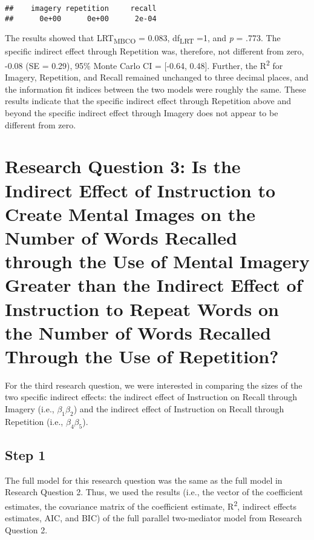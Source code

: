 \documentclass[11pt,]{article}
\begin{document}
\begin{verbatim}
##    imagery repetition     recall 
##      0e+00      0e+00      2e-04
\end{verbatim}

The results showed that LRT\textsubscript{MBCO} = 0.083,
df\textsubscript{LRT} =1, and \emph{p} = .773. The specific indirect
effect through Repetition was, therefore, not different from zero, -0.08
(SE = 0.29), 95\% Monte Carlo CI = {[}-0.64, 0.48{]}. Further, the
R\textsuperscript{2} for Imagery, Repetition, and Recall remained
unchanged to three decimal places, and the information fit indices
between the two models were roughly the same. These results indicate
that the specific indirect effect through Repetition above and beyond
the specific indirect effect through Imagery does not appear to be
different from zero.

\hypertarget{research-question-3-is-the-indirect-effect-of-instruction-to-create-mental-images-on-the-number-of-words-recalled-through-the-use-of-mental-imagery-greater-than-the-indirect-effect-of-instruction-to-repeat-words-on-the-number-of-words-recalled-through-the-use-of-repetition}{%
\section{Research Question 3: Is the Indirect Effect of Instruction to
Create Mental Images on the Number of Words Recalled through the Use of
Mental Imagery Greater than the Indirect Effect of Instruction to Repeat
Words on the Number of Words Recalled Through the Use of
Repetition?}\label{research-question-3-is-the-indirect-effect-of-instruction-to-create-mental-images-on-the-number-of-words-recalled-through-the-use-of-mental-imagery-greater-than-the-indirect-effect-of-instruction-to-repeat-words-on-the-number-of-words-recalled-through-the-use-of-repetition}}

For the third research question, we were interested in comparing the
sizes of the two specific indirect effects: the indirect effect of
Instruction on Recall through Imagery (i.e., \(β_1 β_2\)) and the
indirect effect of Instruction on Recall through Repetition (i.e.,
\(β_4 β_5\)).

\hypertarget{step-1-2}{%
\subsection{Step 1}\label{step-1-2}}

The full model for this research question was the same as the full model
in Research Question 2. Thus, we used the results (i.e., the vector of
the coefficient estimates, the covariance matrix of the coefficient
estimate, R\textsuperscript{2}, indirect effects estimates, AIC, and
BIC) of the full parallel two-mediator model from Research Question 2.
\end{document}
